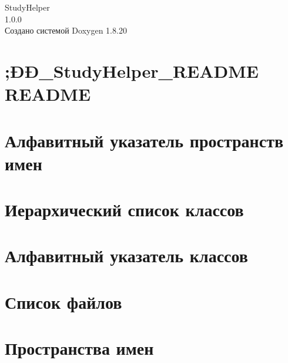 \let\mypdfximage\pdfximage\def\pdfximage{\immediate\mypdfximage}\documentclass[twoside]{book}
\newcommand{\+}{\discretionary{\mbox{\scriptsize$\hookleftarrow$}}{}{}}
\newcommand{\clearemptydoublepage}{%
  \newpage{\pagestyle{empty}\cleardoublepage}%
}
\begin{document}
\hypersetup{pageanchor=false,
             bookmarksnumbered=true,
             pdfencoding=unicode
            }
\begin{titlepage}
\vspace*{7cm}
\begin{center}%
{\Large Study\+Helper \\[1ex]\large 1.\+0.\+0 }\\
\vspace*{1cm}
{\large Создано системой Doxygen 1.8.20}\\
\end{center}
\end{titlepage}
\clearemptydoublepage
{}
\tableofcontents
\clearemptydoublepage
{}
\hypersetup{pageanchor=true}

\chapter{;Ð­Ð\+\_\+\+Study\+Helper\+\_\+\+R\+E\+A\+D\+ME R\+E\+A\+D\+ME}
\label{md___users_vgtstptlk__desktop__xC3_x90_xC2_x9C_xC3_x90_xC2_x98_xC3_x90_6nbsp}

\chapter{Алфавитный указатель пространств имен}

\chapter{Иерархический список классов}

\chapter{Алфавитный указатель классов}

\chapter{Список файлов}

\chapter{Пространства имен}










\end{document}
